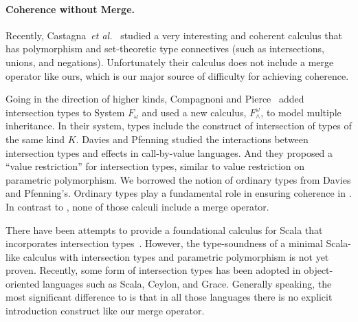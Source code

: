 \begin{comment}
 the way coherence is ensured is not general
enough. He has four different typing rules for the merge operator, each
accounting for various possibilities of what the types of the first and second
components are. In some cases the meaning of the second component takes
precedence (that is, is biased) over the first component. The set of rules is
restrictive and it forbids, for instance, the merge of two functions (even when
they a provably disjoint). Therefore, Forsythe treatment of coherence
is rather ad-hoc. In contrast, disjointness in \name has a simple, well-defined
specification and it is quite flexible.
\end{comment}

\paragraph{Coherence without Merge.}
Recently, Castagna~\textit{et al.}~\cite{Castagna:2014} studied a very interesting
and coherent calculus that has polymorphism and set-theoretic type connectives (such as
intersections, unions, and negations). Unfortunately their calculus
does not include a merge operator like ours, which is our major source
of difficulty for achieving coherence.

Going in the direction of higher
kinds, Compagnoni and Pierce~\cite{compagnoni1996higher} added
intersection types to System $ F_{\omega} $ and used a new calculus,
$ F^{\omega}_{\wedge} $, to model multiple inheritance. In their
system, types include the construct of intersection of types of the
same kind $ K $. Davies and Pfenning
\cite{davies2000intersection} studied the interactions between
intersection types and effects in call-by-value languages. And they
proposed a ``value restriction'' for intersection types, similar to
value restriction on parametric polymorphism.
We borrowed the notion of ordinary types from Davies and Pfenning's.
Ordinary types play a fundamental role in ensuring coherence in \name.
In contrast to \name, none of those calculi include a merge operator.

There have been attempts to provide a foundational calculus
for Scala that incorporates intersection
types~\cite{amin2014foundations,amin2012dependent}.
However, the type-soundness of a minimal Scala-like
calculus with intersection types and parametric polymorphism is not
yet proven. Recently, some form of intersection
types has been adopted in object-oriented languages such as Scala,
Ceylon, and Grace. Generally speaking,
the most significant difference to \name is that in all those languages
there is no explicit introduction construct like our merge operator.

